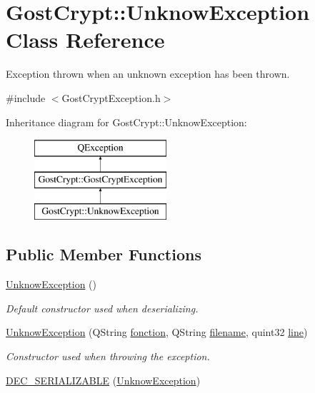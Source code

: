 \hypertarget{class_gost_crypt_1_1_unknow_exception}{}\section{Gost\+Crypt\+:\+:Unknow\+Exception Class Reference}
\label{class_gost_crypt_1_1_unknow_exception}


Exception thrown when an unknown exception has been thrown.  




{\ttfamily \#include $<$Gost\+Crypt\+Exception.\+h$>$}

Inheritance diagram for Gost\+Crypt\+:\+:Unknow\+Exception\+:\begin{figure}[H]
\begin{center}
\leavevmode
\includegraphics[height=3.000000cm]{class_gost_crypt_1_1_unknow_exception}
\end{center}
\end{figure}
\subsection*{Public Member Functions}
\begin{DoxyCompactItemize}
\item 
\hyperlink{class_gost_crypt_1_1_unknow_exception_aef9a371b92a79400a53facb2150a3b20}{Unknow\+Exception} ()
\begin{DoxyCompactList}\small\item\em Default constructor used when deserializing. \end{DoxyCompactList}\item 
\hyperlink{class_gost_crypt_1_1_unknow_exception_ae76a78c92ee428edd5f71aaff105b3ff}{Unknow\+Exception} (Q\+String \hyperlink{class_gost_crypt_1_1_gost_crypt_exception_a29b8c93d5efbb1ff369107385725a939}{fonction}, Q\+String \hyperlink{class_gost_crypt_1_1_gost_crypt_exception_a749a12375f4ba9d502623b99d8252f38}{filename}, quint32 \hyperlink{class_gost_crypt_1_1_gost_crypt_exception_abf506d911f12a4e969eea500f90bd32c}{line})
\begin{DoxyCompactList}\small\item\em Constructor used when throwing the exception. \end{DoxyCompactList}\item 
\hyperlink{class_gost_crypt_1_1_unknow_exception_afa9dd92e5a8ccd3692fc57a71d9b3e62}{D\+E\+C\+\_\+\+S\+E\+R\+I\+A\+L\+I\+Z\+A\+B\+LE} (\hyperlink{class_gost_crypt_1_1_unknow_exception}{Unknow\+Exception})
\end{DoxyCompactItemize}
